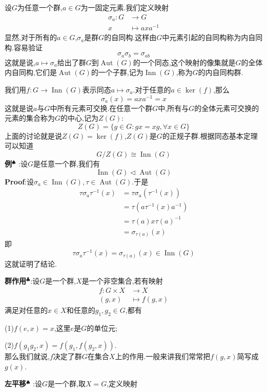 设$G$为任意一个群,$a\in G$为一固定元素.我们定义映射
$$
\begin{aligned}
    \sigma_a:G &\to G\\
             x &\mapsto axa^{-1}
\end{aligned}
$$
显然,对于所有的$a\in G$,$\sigma_a$是群$G$的自同构.这样由$G$中元素引起的自同构称为内自同构.容易验证
$$
\sigma_a\sigma_b = \sigma_{ab}
$$
这就是说,$a\mapsto \sigma_a$给出了群$G$到$\operatorname{Aut}(G)$的一个同态,这个映射的像集就是$G$的全体内自同构,它们是$\operatorname{Aut}(G)$的一个子群,记为$\operatorname{Inn}(G)$,称为$G$的内自同构群.\par
我们用$f:G\to \operatorname{Inn}(G)$表示同态$a\mapsto \sigma_a$.对于任意的$a\in\operatorname{ker}(f)$,那么
$$
\sigma_a(x)=axa^{-1}=x
$$
这就是说$a$与$G$中所有元素可交换.在任意一个群$G$中,所有与$G$的全体元素可交换的元素的集合称为$G$的中心,记为$Z(G)$:
$$
Z(G)=\{g\in G:gx=xg,\forall x\in G\}
$$
上面的讨论就是说$Z(G)=\operatorname{ker}(f)$,$Z(G)$是$G$的正规子群.根据同态基本定理可以知道
$$
G/Z(G)\cong \operatorname{Inn}(G)
$$
\qquad \textbf{例}$^\spadesuit$ :设$G$是任意一个群,我们有
$$
\operatorname{Inn}(G)\triangleleft \operatorname{Aut}(G)
$$
\qquad \textbf{Proof}:设$\sigma_a\in\operatorname{Inn}(G),\tau\in\operatorname{Aut}(G)$.于是
$$
\begin{aligned}
    \tau\sigma_a\tau^{-1}(x) &= \tau\sigma_a(\tau^{-1}(x))\\
                             &= \tau(a\tau^{-1}(x)a^{-1})\\
                             &= \tau(a)x\tau(a)^{-1}\\
                             &= \sigma_{\tau(a)}(x)
\end{aligned}
$$
即
$$
\tau\sigma_a\tau^{-1}(x)=\sigma_{\tau(a)}(x)\in\operatorname{Inn}(G)
$$
这就证明了结论.\par
\textbf{群作用}$^\clubsuit $:设$G$是一个群,$X$是一个非空集合,若有映射
$$
\begin{aligned}
    f :G\times X&\to X\\
          (g,x)&\mapsto f (g,x)
\end{aligned}
$$
满足对任意的$x\in X$和任意的$g_1,g_2\in G$,都有\par
(1)$f(e,x)=x$,这里$e$是$G$的单位元;\par
(2)$f(g_1g_2,x)=f(g_1,f(g_2,x))$.\\
那么我们就说,$f$决定了群$G$在集合$X$上的作用.一般来讲我们常常把$f(g,x)$简写成$g(x)$.\par
\textbf{左平移}$^\spadesuit$ :设$G$是一个群,取$X=G$,定义映射
